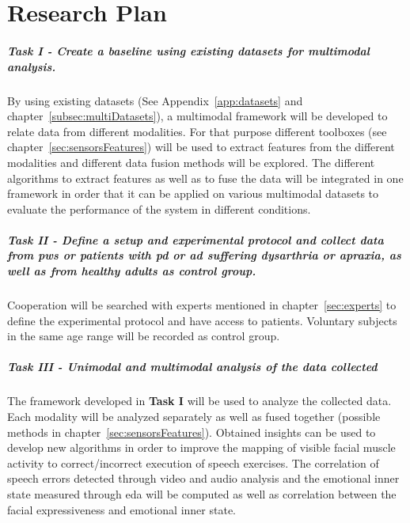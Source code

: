 \chapter{Research Plan}
\label{cha:plan}
\acresetall

\paragraph{Task I - Create a baseline using existing datasets for multimodal analysis.}
By using existing datasets (See Appendix~\ref{app:datasets} and chapter~\ref{subsec:multiDatasets}), a multimodal framework will be developed to relate data from different modalities. For that purpose different toolboxes (see chapter~\ref{sec:sensorsFeatures}) will be used to extract features from the different modalities and different data fusion methods will be explored. The different algorithms to extract features as well as to fuse the data will be integrated in one framework in order that it can be applied on various multimodal datasets to evaluate the performance of the system in different conditions.

\paragraph{Task II - Define a setup and experimental protocol and collect data from \gls{pws} or patients with \gls{pd} or \gls{ad} suffering \gls{dysarthria} or \gls{apraxia}, as well as from healthy adults as control group.}
Cooperation will be searched with experts mentioned in chapter~\ref{sec:experts} to define the experimental protocol and have access to patients. Voluntary subjects in the same age range will be recorded as control group.

\paragraph{Task III - Unimodal and multimodal analysis of the data collected} The framework developed in \textbf{Task I} will be used to analyze the collected data. Each modality will be analyzed separately as well as fused together (possible methods in chapter~\ref{sec:sensorsFeatures}). Obtained insights can be used to develop new algorithms in order to improve the mapping of visible facial muscle activity to correct/incorrect execution of speech exercises. The correlation of speech errors detected through video and audio analysis and the emotional inner state measured through \gls{eda} will be computed as well as correlation between the facial expressiveness and emotional inner state. 

